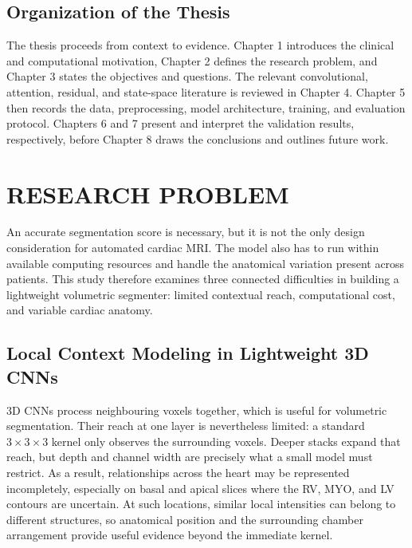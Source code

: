 \section{Organization of the Thesis}
The thesis proceeds from context to evidence. Chapter 1 introduces the clinical and computational motivation, Chapter 2 defines the research problem, and Chapter 3 states the objectives and questions. The relevant convolutional, attention, residual, and state-space literature is reviewed in Chapter 4. Chapter 5 then records the data, preprocessing, model architecture, training, and evaluation protocol. Chapters 6 and 7 present and interpret the validation results, respectively, before Chapter 8 draws the conclusions and outlines future work.

\chapter{RESEARCH PROBLEM}
\label{chap:problem}

An accurate segmentation score is necessary, but it is not the only design consideration for automated cardiac MRI. The model also has to run within available computing resources and handle the anatomical variation present across patients. This study therefore examines three connected difficulties in building a lightweight volumetric segmenter: limited contextual reach, computational cost, and variable cardiac anatomy.

\section{Local Context Modeling in Lightweight 3D CNNs}
3D CNNs process neighbouring voxels together, which is useful for volumetric segmentation. Their reach at one layer is nevertheless limited: a standard $3 \times 3 \times 3$ kernel only observes the surrounding voxels. Deeper stacks expand that reach, but depth and channel width are precisely what a small model must restrict. As a result, relationships across the heart may be represented incompletely, especially on basal and apical slices where the RV, MYO, and LV contours are uncertain. At such locations, similar local intensities can belong to different structures, so anatomical position and the surrounding chamber arrangement provide useful evidence beyond the immediate kernel.

